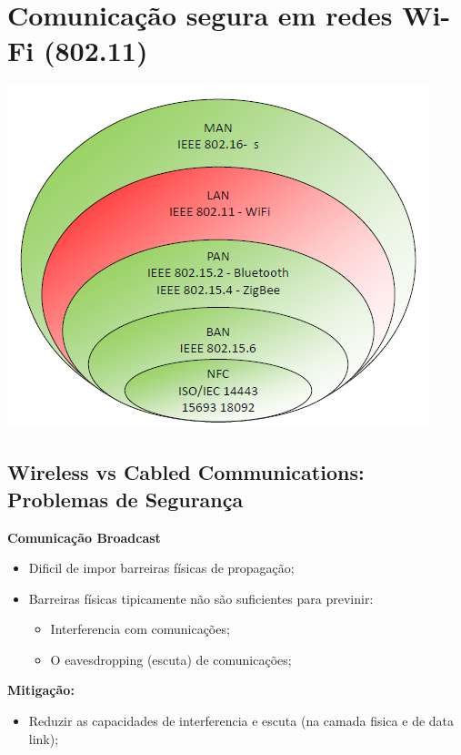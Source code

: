 \documentclass{article}
\begin{document}
\section{Comunicação segura em redes Wi-Fi (802.11)}

\begin{center}
  \includegraphics[scale=0.6]{40}
\end{center}

\pagebreak

\subsection{Wireless vs Cabled Communications: Problemas de Segurança}

\begin{flushleft}
  \textbf{Comunicação Broadcast}
  \begin{itemize}
    \item Dificil de impor barreiras físicas de propagação;
    \item Barreiras físicas tipicamente não são suficientes para previnir:
    \begin{itemize}
      \item Interferencia com comunicações;
      \item O eavesdropping (escuta) de comunicações;
    \end{itemize}
  \end{itemize}

  \textbf{Mitigação:}
    \begin{itemize}
      \item Reduzir as capacidades de interferencia e escuta (na camada fisica e
      de data link);
    \end{itemize}
\end{flushleft}
\end{document}
